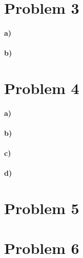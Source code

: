 \documentclass[12pt]{article}
\begin{document}
\section*{Problem 3}

\paragraph{a)}

\paragraph{b)}

\section*{Problem 4}

\paragraph{a)}

\paragraph{b)}

\paragraph{c)}

\paragraph{d)}

\section*{Problem 5}

\section*{Problem 6}
\end{document}
